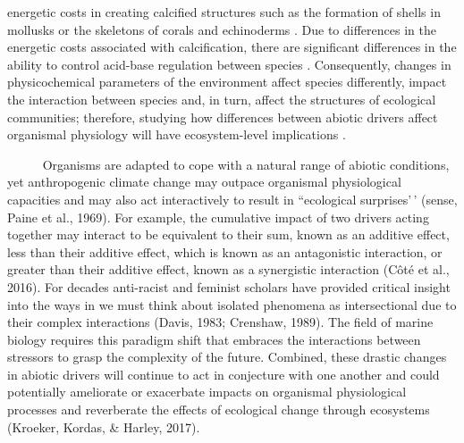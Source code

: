\documentclass[
]{article}
\begin{document}
energetic costs in creating calcified structures such as the formation
of shells in mollusks or the skeletons of corals and echinoderms
\citep{doney2009ocean, spalding2017energetic}. Due to differences in the
energetic costs associated with calcification, there are significant
differences in the ability to control acid-base regulation between
species \citep{doney2009ocean}. Consequently, changes in physicochemical
parameters of the environment affect species differently, impact the
interaction between species and, in turn, affect the structures of
ecological communities; therefore, studying how differences between
abiotic drivers affect organismal physiology will have ecosystem-level
implications \citep{tomanek2002physiological, barclay2019variation}.

~~~~~ Organisms are adapted to cope with a natural range of abiotic
conditions, yet anthropogenic climate change may outpace organismal
physiological capacities and may also act interactively to result in
``ecological surprises'\,' (sense, Paine et al., 1969). For example, the
cumulative impact of two drivers acting together may interact to be
equivalent to their sum, known as an additive effect, less than their
additive effect, which is known as an antagonistic interaction, or
greater than their additive effect, known as a synergistic interaction
(Côté et al., 2016). For decades anti-racist and feminist scholars have
provided critical insight into the ways in we must think about isolated
phenomena as intersectional due to their complex interactions (Davis,
1983; Crenshaw, 1989). The field of marine biology requires this
paradigm shift that embraces the interactions between stressors to grasp
the complexity of the future. Combined, these drastic changes in abiotic
drivers will continue to act in conjecture with one another and could
potentially ameliorate or exacerbate impacts on organismal physiological
processes and reverberate the effects of ecological change through
ecosystems (Kroeker, Kordas, \& Harley, 2017).

\newpage
\end{document}
